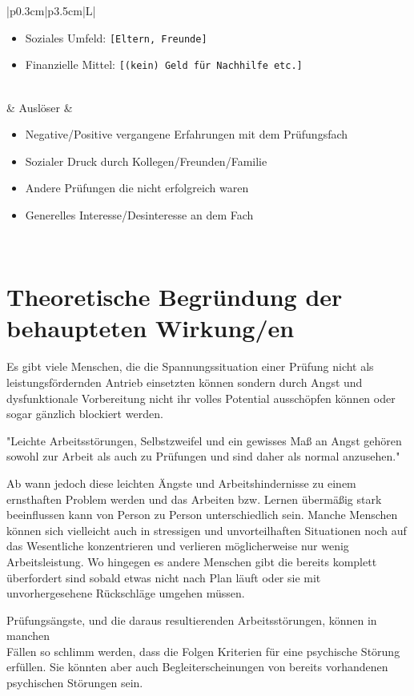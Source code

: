 \documentclass[11pt, a4paper]{article}
\begin{document}
\begin{table}[h!]
\begin{tabularx}{\textwidth}{|p{0.3cm}|p{3.5cm}|L|}
\begin{itemize}[noitemsep, topsep=0pt]
			\item Soziales Umfeld: \texttt{[Eltern, Freunde]}
			\item Finanzielle Mittel: \texttt{[(kein) Geld für Nachhilfe etc.]}
		\end{itemize} \\
		 & Auslöser                               & 
		\begin{itemize}[noitemsep, topsep=0pt]
			\item Negative/Positive vergangene Erfahrungen mit dem Prüfungsfach
			\item Sozialer Druck durch Kollegen/Freunden/Familie
			\item Andere Prüfungen die nicht erfolgreich waren
			\item Generelles Interesse/Desinteresse an dem Fach
		\end{itemize} \\
		\hline
	\end{tabularx}
\end{table}
\newpage

\section*{Theoretische Begründung der behaupteten Wirkung/en}
Es gibt viele Menschen, die die Spannungssituation einer Prüfung nicht als leistungsfördernden Antrieb einsetzten können sondern durch Angst und dysfunktionale Vorbereitung nicht ihr volles Potential ausschöpfen können oder sogar gänzlich blockiert werden. \cite{Holm-Hadulla2009}

"Leichte Arbeitsstörungen, Selbstzweifel und ein gewisses Maß an Angst gehören sowohl zur Arbeit als auch zu Prüfungen und sind daher als normal anzusehen." \cite{Holm-Hadulla2009}

Ab wann jedoch diese leichten Ängste und Arbeitshindernisse zu einem ernsthaften Problem werden und das Arbeiten bzw. Lernen übermäßig stark beeinflussen kann von Person zu Person unterschiedlich sein. Manche Menschen können sich vielleicht auch in stressigen und unvorteilhaften Situationen noch auf das Wesentliche konzentrieren und verlieren möglicherweise nur wenig Arbeitsleistung. Wo hingegen es andere Menschen gibt die bereits komplett überfordert sind sobald etwas nicht nach Plan läuft oder sie mit unvorhergesehene Rückschläge umgehen müssen.

Prüfungsängste, und die daraus resultierenden Arbeitsstörungen, können in manchen\\ Fällen so schlimm werden, dass die Folgen Kriterien für eine psychische Störung erfüllen. Sie könnten aber auch Begleiterscheinungen von bereits vorhandenen psychischen Störungen sein. \cite{Holm-Hadulla2009}
\end{document}
